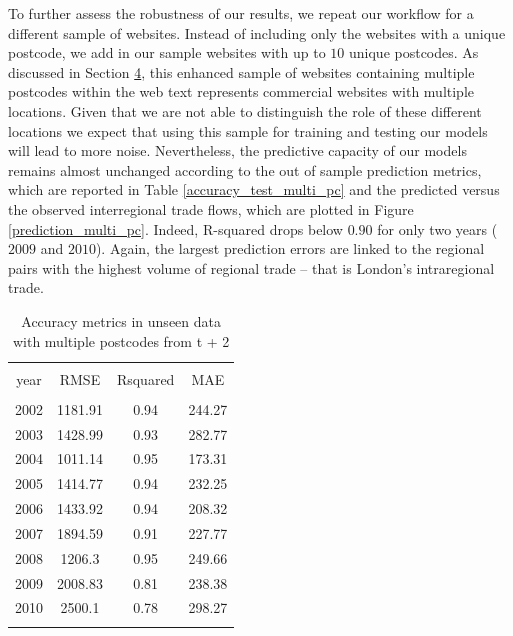 \documentclass[]{interact}
\theoremstyle{plain}%
\theoremstyle{definition}
\theoremstyle{remark}
\begin{document}
To further assess the robustness of our results, we repeat our workflow
for a different sample of websites. Instead of including only the
websites with a unique postcode, we add in our sample websites with up
to \(10\) unique postcodes. As discussed in Section
\protect\hyperlink{sec:4}{4}, this enhanced sample of websites
containing multiple postcodes within the web text represents commercial
websites with multiple locations. Given that we are not able to
distinguish the role of these different locations we expect that using
this sample for training and testing our models will lead to more noise.
Nevertheless, the predictive capacity of our models remains almost
unchanged according to the out of sample prediction metrics, which are
reported in Table \ref{accuracy_test_multi_pc} and the predicted versus
the observed interregional trade flows, which are plotted in Figure
\ref{prediction_multi_pc}. Indeed, R-squared drops below \(0.90\) for
only two years (\(2009\) and \(2010\)). Again, the largest prediction
errors are linked to the regional pairs with the highest volume of
regional trade -- that is London's intraregional trade.

\begin{table}[!htbp] \centering 
  \caption{Accuracy metrics in unseen data with multiple postcodes from t + 2\label{accuracy_test_multi_pc}} 
  \label{} 
\footnotesize 
\begin{tabular}{@{\extracolsep{0pt}} cccc} 
\\[-1.8ex]\hline 
\hline \\[-1.8ex] 
year & RMSE & Rsquared & MAE \\ 
\hline \\[-1.8ex] 
2002 & 1181.91 & 0.94 & 244.27 \\ 
2003 & 1428.99 & 0.93 & 282.77 \\ 
2004 & 1011.14 & 0.95 & 173.31 \\ 
2005 & 1414.77 & 0.94 & 232.25 \\ 
2006 & 1433.92 & 0.94 & 208.32 \\ 
2007 & 1894.59 & 0.91 & 227.77 \\ 
2008 & 1206.3 & 0.95 & 249.66 \\ 
2009 & 2008.83 & 0.81 & 238.38 \\ 
2010 & 2500.1 & 0.78 & 298.27 \\ 
\hline \\[-1.8ex] 
\end{tabular} 
\end{table}
\end{document}
